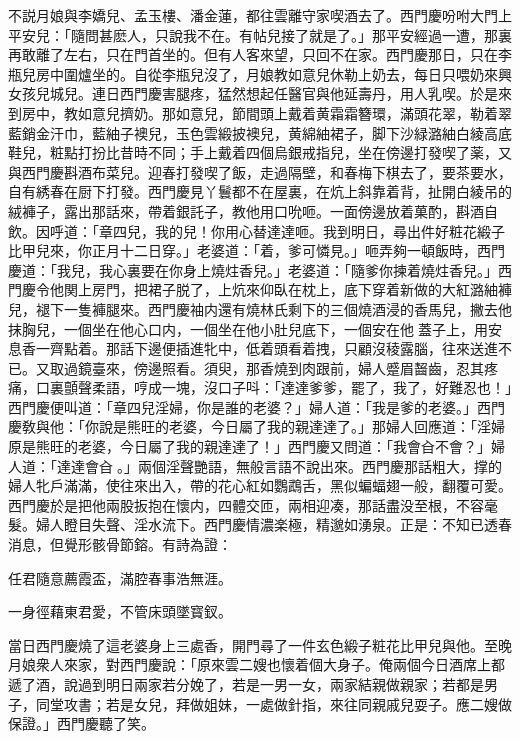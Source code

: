 不説月娘與李嬌兒、孟玉樓、潘金蓮，都往雲離守家喫酒去了。西門慶吩咐大門上平安兒：「隨問甚麽人，只說我不在。有帖兒接了就是了。」那平安經過一遭，那裏再敢離了左右，只在門首坐的。但有人客來望，只回不在家。西門慶那日，只在李瓶兒房中圍爐坐的。自從李瓶兒沒了，月娘教如意兒休勒上奶去，每日只喂奶來興女孩兒城兒。連日西門慶害腿疼，猛然想起任醫官與他延壽丹，用人乳喫。於是來到房中，教如意兒擠奶。那如意兒，節間頭上戴着黄霜霜簪環，滿頭花翠，勒着翠藍銷金汗巾，藍紬子襖兒，玉色雲緞披襖兒，黄綿紬裙子，脚下沙緑潞紬白綾高底鞋兒，粧點打扮比昔時不同；手上戴着四個烏銀戒指兒，坐在傍邊打發喫了薬，又與西門慶斟酒布菜兒。迎春打發喫了飯，走過隔壁，和春梅下棋去了，要茶要水，自有綉春在厨下打發。西門慶見丫鬟都不在屋裏，在炕上斜靠着背，扯開白綾吊的絨褲子，露出那話來，帶着銀託子，教他用口吮咂。一面傍邊放着菓酌，斟酒自飲。因呼道：「章四兒，我的兒！你用心替達達咂。我到明日，尋出件好粧花緞子比甲兒來，你正月十二日穿。」老婆道：「着，爹可憐見。」咂弄夠一頓飯時，西門慶道：「我兒，我心裏要在你身上燒炷香兒。」老婆道：「隨爹你揀着燒炷香兒。」西門慶令他関上房門，把裙子脱了，上炕來仰臥在枕上，底下穿着新做的大紅潞紬褲兒，褪下一隻褲腿來。西門慶袖内還有燒林氏剩下的三個燒酒浸的香馬兒，撇去他抹胸兒，一個坐在他心口内，一個坐在他小肚兒底下，一個安在他𣭈蓋子上，用安息香一齊點着。那話下邊便插進牝中，低着頭看着拽，只顧沒稜露腦，往來送進不已。又取過鏡臺來，傍邊照看。須臾，那香燒到肉跟前，婦人蹙眉齧齒，忍其疼痛，口裏顫聲柔語，哼成一塊，沒口子呌：「達達爹爹，罷了，我了，好難忍也！」西門慶便叫道：「章四兒淫婦，你是誰的老婆？」婦人道：「我是爹的老婆。」西門慶敎與他：「你說是熊旺的老婆，今日屬了我的親達達了。」那婦人回應道：「淫婦原是熊旺的老婆，今日屬了我的親達達了！」西門慶又問道：「我會㒲不會？」婦人道：「達達會㒲𣭈。」兩個淫聲艷語，無般言語不說出來。西門慶那話粗大，撑的婦人牝戶滿滿，使往來出入，帶的花心紅如鸚鵡舌，黑似蝙蝠翅一般，翻覆可愛。西門慶於是把他兩股扳抱在懷内，四體交匝，兩相迎凑，那話盡没至根，不容毫髮。婦人瞪目失聲、淫水流下。西門慶情濃楽極，精邈如湧泉。正是：不知已透春消息，但覺形骸骨節鎔。有詩為證：

\begin{myquote}
任君隨意薦霞盃，滿腔春事浩無涯。

一身徑藉東君愛，不管床頭墜寳釵。
\end{myquote}

當日西門慶燒了這老婆身上三處香，開門尋了一件玄色緞子粧花比甲兒與他。至晚月娘衆人來家，對西門慶說：「原來雲二嫂也懷着個大身子。俺兩個今日酒席上都遞了酒，說過到明日兩家若分娩了，若是一男一女，兩家結親做親家；若都是男子，同堂攻書；若是女兒，拜做姐妹，一處做針指，來往同親戚兒耍子。應二嫂做保證。」西門慶聽了笑。


